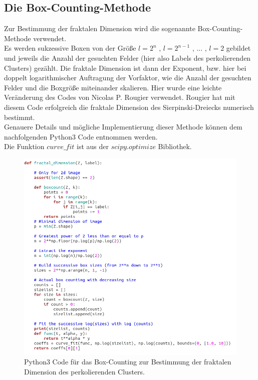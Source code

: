 \documentclass[a4paper, 12pt]{report}
\begin{document}
\subsection{Die Box-Counting-Methode}
Zur Bestimmung der fraktalen Dimension wird die sogenannte Box-Counting-Methode verwendet.\cite{Box_counting_wiki}
\\
\noindent Es werden sukzessive Boxen von der Größe $l=2^n$ , $l=2^{n-1}$ , ... , $l=2$ gebildet und jeweils die Anzahl der gesuchten Felder (hier also Labels des perkolierenden Clusters) gezählt. Die fraktale Dimension ist dann der Exponent, bzw. hier bei doppelt logarithmischer Auftragung der Vorfaktor, wie die Anzahl der gesuchten Felder und die Boxgröße miteinander skalieren. Hier wurde eine leichte Veränderung des Codes von Nicolas P. Rougier verwendet\cite{Rougier}. Rougier hat mit diesem Code erfolgreich die fraktale Dimension des Sierpinski-Dreiecks numerisch bestimmt.
\\
Genauere Details und mögliche Implementierung dieser Methode können dem nachfolgenden Python3 Code entnommen werden.
\\
\noindent Die Funktion $curve\_fit$ ist aus der $scipy.optimize$ Bibliothek.
\begin{figure}[H]
	\centering
	\includegraphics[scale=0.75]{fractaldim_code.png}
	\caption{Python3 Code für das Box-Counting zur Bestimmung der fraktalen Dimension des perkolierenden Clusters.}
\end{figure}
\end{document}
